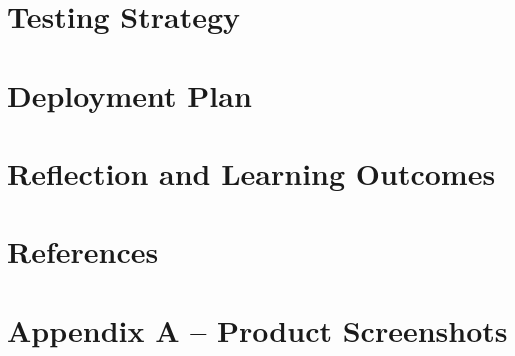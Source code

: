 \documentclass[12pt, a4paper]{article}
\begin{document}
\section{Testing Strategy}


\section{Deployment Plan}


\section{Reflection and Learning Outcomes}


\newpage
\section{References}



\section{Appendix A -- Product Screenshots}

\end{document}
